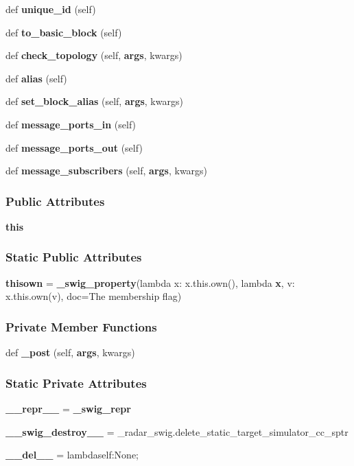 \begin{DoxyCompactItemize}
def {\bf unique\+\_\+id} (self)
\item 
def {\bf to\+\_\+basic\+\_\+block} (self)
\item 
def {\bf check\+\_\+topology} (self, {\bf args}, kwargs)
\item 
def {\bf alias} (self)
\item 
def {\bf set\+\_\+block\+\_\+alias} (self, {\bf args}, kwargs)
\item 
def {\bf message\+\_\+ports\+\_\+in} (self)
\item 
def {\bf message\+\_\+ports\+\_\+out} (self)
\item 
def {\bf message\+\_\+subscribers} (self, {\bf args}, kwargs)
\end{DoxyCompactItemize}
\subsubsection*{Public Attributes}
\begin{DoxyCompactItemize}
\item 
{\bf this}
\end{DoxyCompactItemize}
\subsubsection*{Static Public Attributes}
\begin{DoxyCompactItemize}
\item 
{\bf thisown} = {\bf \+\_\+swig\+\_\+property}(lambda x\+: x.\+this.\+own(), lambda {\bf x}, v\+: x.\+this.\+own(v), doc=\textquotesingle{}The membership flag\textquotesingle{})
\end{DoxyCompactItemize}
\subsubsection*{Private Member Functions}
\begin{DoxyCompactItemize}
\item 
def {\bf \+\_\+post} (self, {\bf args}, kwargs)
\end{DoxyCompactItemize}
\subsubsection*{Static Private Attributes}
\begin{DoxyCompactItemize}
\item 
{\bf \+\_\+\+\_\+repr\+\_\+\+\_\+} = {\bf \+\_\+swig\+\_\+repr}
\item 
{\bf \+\_\+\+\_\+swig\+\_\+destroy\+\_\+\+\_\+} = \+\_\+radar\+\_\+swig.\+delete\+\_\+static\+\_\+target\+\_\+simulator\+\_\+cc\+\_\+sptr
\item 
{\bf \+\_\+\+\_\+del\+\_\+\+\_\+} = lambdaself\+:\+None;
\end{DoxyCompactItemize}


